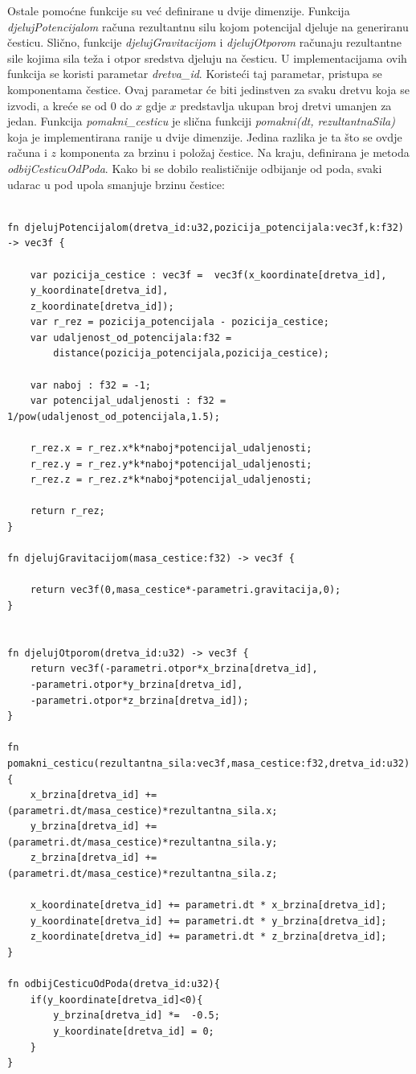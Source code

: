 \documentclass{foi}
\begin{document}
Ostale pomoćne funkcije su već definirane u dvije dimenzije. Funkcija \textit{djelujPotencijalom} računa rezultantnu silu kojom potencijal djeluje na generiranu česticu. Slično, funkcije \textit{djelujGravitacijom} i \textit{djelujOtporom} računaju rezultantne sile kojima sila teža i otpor sredstva djeluju na česticu. U implementacijama ovih funkcija se koristi parametar \textit{dretva\_id}. Koristeći taj parametar, pristupa se komponentama čestice. Ovaj parametar će biti jedinstven za svaku dretvu koja se izvodi, a kreće se od 0 do $x$ gdje $x$ predstavlja ukupan broj dretvi umanjen za jedan.  Funkcija \textit{pomakni\_cesticu} je slična funkciji  \textit{pomakni(dt, rezultantnaSila)} koja je implementirana ranije u dvije dimenzije. Jedina razlika je ta što se ovdje računa i $z$ komponenta za brzinu i položaj čestice. Na kraju, definirana je metoda \textit{odbijCesticuOdPoda}. Kako bi se dobilo realističnije odbijanje od poda, svaki udarac u pod upola smanjuje brzinu čestice:
	
\begin{verbatim}

fn djelujPotencijalom(dretva_id:u32,pozicija_potencijala:vec3f,k:f32) -> vec3f {    
	
	var pozicija_cestice : vec3f =  vec3f(x_koordinate[dretva_id],
	y_koordinate[dretva_id],
	z_koordinate[dretva_id]);
	var r_rez = pozicija_potencijala - pozicija_cestice;
	var udaljenost_od_potencijala:f32 = 
		distance(pozicija_potencijala,pozicija_cestice);
	
	var naboj : f32 = -1;
	var potencijal_udaljenosti : f32 = 1/pow(udaljenost_od_potencijala,1.5);
	
	r_rez.x = r_rez.x*k*naboj*potencijal_udaljenosti;
	r_rez.y = r_rez.y*k*naboj*potencijal_udaljenosti;
	r_rez.z = r_rez.z*k*naboj*potencijal_udaljenosti;
	
	return r_rez;
}

fn djelujGravitacijom(masa_cestice:f32) -> vec3f {
	
	return vec3f(0,masa_cestice*-parametri.gravitacija,0);
}


fn djelujOtporom(dretva_id:u32) -> vec3f {
	return vec3f(-parametri.otpor*x_brzina[dretva_id],
	-parametri.otpor*y_brzina[dretva_id],
	-parametri.otpor*z_brzina[dretva_id]);
}

fn pomakni_cesticu(rezultantna_sila:vec3f,masa_cestice:f32,dretva_id:u32){
	x_brzina[dretva_id] +=  (parametri.dt/masa_cestice)*rezultantna_sila.x;
	y_brzina[dretva_id] +=  (parametri.dt/masa_cestice)*rezultantna_sila.y;
	z_brzina[dretva_id] +=  (parametri.dt/masa_cestice)*rezultantna_sila.z;
	
	x_koordinate[dretva_id] += parametri.dt * x_brzina[dretva_id];
	y_koordinate[dretva_id] += parametri.dt * y_brzina[dretva_id];
	z_koordinate[dretva_id] += parametri.dt * z_brzina[dretva_id];
}

fn odbijCesticuOdPoda(dretva_id:u32){
	if(y_koordinate[dretva_id]<0){
		y_brzina[dretva_id] *=  -0.5;
		y_koordinate[dretva_id] = 0;
	}
}
\end{verbatim}
	
\end{document}
